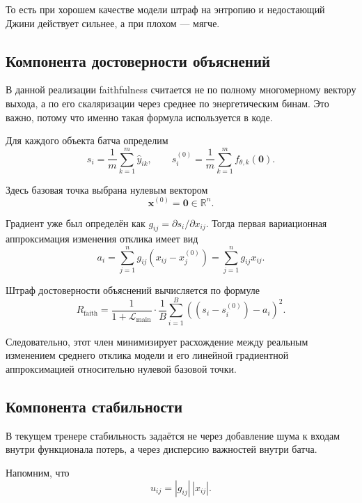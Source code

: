 \documentclass[11pt]{article}
\begin{document}
То есть при хорошем качестве модели штраф на энтропию и недостающий Джини действует сильнее, а при плохом --- мягче.

\subsection{Компонента достоверности объяснений}

В данной реализации faithfulness считается не по полному многомерному вектору выхода, а по его скаляризации через среднее по энергетическим бинам. Это важно, потому что именно такая формула используется в коде.

Для каждого объекта батча определим
\begin{equation}
 s_i = \frac{1}{m} \sum_{k=1}^{m} \hat{y}_{ik},
 \qquad
 s_i^{(0)} = \frac{1}{m} \sum_{k=1}^{m} f_{\theta,k}(\mathbf{0}).
\end{equation}

Здесь базовая точка выбрана нулевым вектором
\begin{equation}
\mathbf{x}^{(0)} = \mathbf{0} \in \mathbb{R}^n.
\end{equation}

Градиент уже был определён как $g_{ij} = \partial s_i / \partial x_{ij}$. Тогда первая вариационная аппроксимация изменения отклика имеет вид
\begin{equation}
 a_i = \sum_{j=1}^{n} g_{ij}(x_{ij} - x_j^{(0)}) = \sum_{j=1}^{n} g_{ij}x_{ij}.
\end{equation}

Штраф достоверности объяснений вычисляется по формуле
\begin{equation}
R_{\mathrm{faith}} = \frac{1}{1 + \mathcal{L}_{\mathrm{main}}}
\cdot
\frac{1}{B} \sum_{i=1}^{B} \left( (s_i - s_i^{(0)}) - a_i \right)^2.
\end{equation}

Следовательно, этот член минимизирует расхождение между реальным изменением среднего отклика модели и его линейной градиентной аппроксимацией относительно нулевой базовой точки.

\subsection{Компонента стабильности}

В текущем тренере стабильность задаётся не через добавление шума к входам внутри функционала потерь, а через дисперсию важностей внутри батча.

Напомним, что
\begin{equation}
 u_{ij} = |g_{ij}|\,|x_{ij}|.
\end{equation}
\end{document}
